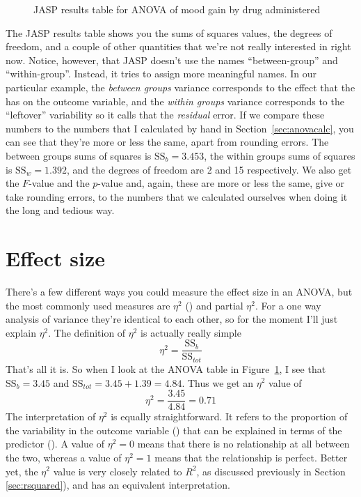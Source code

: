 \begin{figure}[htb]
\begin{center}
\caption{JASP results table for ANOVA of mood gain by drug administered}
\HR
\label{fig:anova2}
\end{center}
\end{figure}

The JASP results table shows you the sums of squares values, the degrees of freedom, and a couple of other quantities that we're not really interested in right now. Notice, however, that JASP doesn't use the names ``between-group'' and ``within-group''. Instead, it tries to assign more meaningful names. In our particular example, the {\it between groups} variance corresponds to the effect that the  has on the outcome variable, and the {\it within groups} variance corresponds to the ``leftover'' variability so it calls that the {\it residual} error. If we compare these numbers to the numbers that I calculated by hand in Section~\ref{sec:anovacalc}, you can see that they're more or less the same, apart from rounding errors. The between groups sums of squares is $\mbox{SS}_b = 3.453$, the within groups sums of squares is $\mbox{SS}_w = 1.392$, and the degrees of freedom are 2 and 15 respectively. We also get the $F$-value and the $p$-value and, again, these are more or less the same, give or take rounding errors, to the numbers that we calculated ourselves when doing it the long and tedious way. 


\section{Effect size\label{sec:etasquared}}

There's a few different ways you could measure the effect size in an ANOVA, but the most commonly used measures are $\eta^2$ () and partial $\eta^2$. For a one way analysis of variance they're identical to each other, so for the moment I'll just explain $\eta^2$. The definition of $\eta^2$ is actually really simple
$$
\eta^2 = \frac{\mbox{SS}_b}{\mbox{SS}_{tot}}
$$
That's all it is. So when I look at the ANOVA table in Figure~\ref{fig:anova2}, I see that $\mbox{SS}_b = 3.45$  and $\mbox{SS}_{tot} = 3.45 + 1.39 = 4.84$. Thus we get an $\eta^2$ value of 
$$
\eta^2 = \frac{3.45}{4.84} = 0.71
$$
The interpretation of $\eta^2$ is equally straightforward. It refers to the proportion of the variability in the outcome variable () that can be explained in terms of the predictor (). A value of $\eta^2 = 0$ means that there is no relationship at all between the two, whereas a value of $\eta^2 = 1$ means that the relationship is perfect. Better yet, the $\eta^2$ value is very closely related to $R^2$, as discussed previously in Section \ref{sec:rsquared}), and has an equivalent interpretation.

